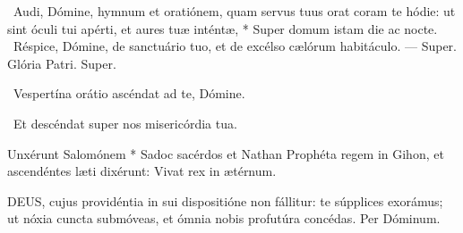 \R\ Audi, Dómine, hymnum et oratiónem, quam servus tuus orat coram te hódie: ut sint óculi tui apérti, et aures tuæ inténtæ, * Super domum istam die ac nocte. \V\ Réspice, Dómine, de sanctuário tuo, et de excélso cælórum habitáculo. --- Super. Glória Patri. Super.


\V\ Vespertína orátio ascéndat ad te, Dómine.

\R\ Et descéndat super nos misericórdia tua.

 Unxérunt Salomónem * Sadoc sacérdos et Nathan Prophéta regem in Gihon, et ascendéntes læti dixérunt: Vivat rex in ætérnum.


\lettrine[lines=2]{D}{EUS}, cujus providéntia in sui dispositióne non fállitur: te súpplices exorámus; ut nóxia cuncta submóveas, et ómnia nobis profutúra concédas. Per Dóminum.




